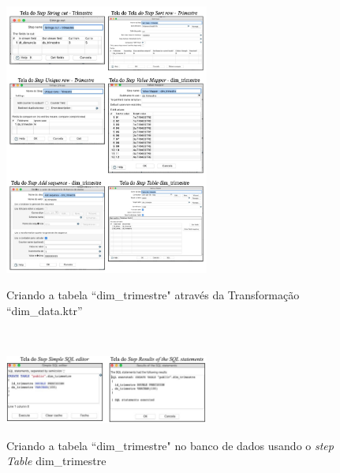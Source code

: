 \begin{figure}[H]
	\vspace*{0,2cm}
    \centering
    \caption{Criando a tabela ``dim\_trimestre" atrav\'{e}s da Transforma\c{c}\~{a}o ``dim\_data.ktr''}
    \includegraphics[width=0.6\textwidth]{./04-figuras/figura-dim-trimestre}
    \label{fig:ilustfigdimtrimestre}
\end{figure}
\vspace*{-0,9cm}
{\raggedright {}} \\

\begin{figure}[H]
	\vspace*{0,2cm}
    \centering
    \caption{Criando a tabela ``dim\_trimestre" no banco de dados usando o \textit{step Table} dim\_trimestre}
    \includegraphics[width=0.6\textwidth]{./04-figuras/figura-tb-dim-trimestre}
    \label{fig:ilustfigtbdimtrimestre}
\end{figure}
\vspace*{-0,9cm}
{\raggedright {}} \\

